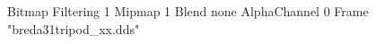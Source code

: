 {Bitmap
	{Filtering 1}
	{Mipmap 1}
	{Blend none}
	{AlphaChannel 0}
	{Frame "breda31tripod_xx.dds"}
}
